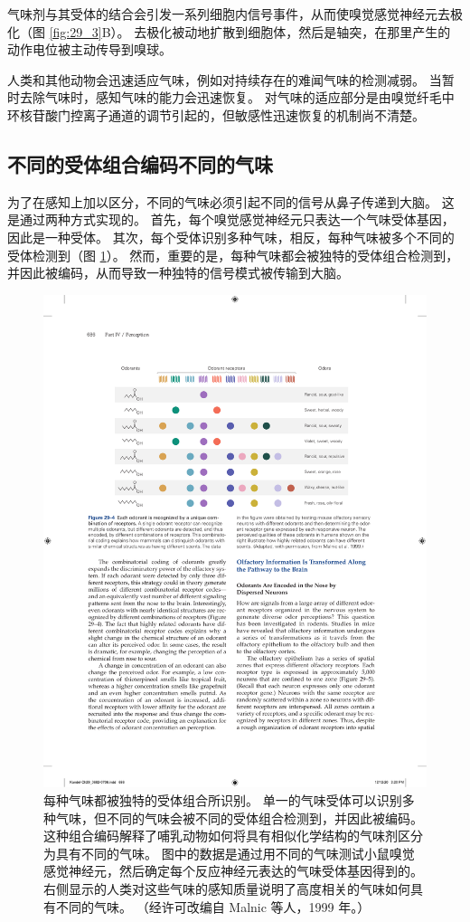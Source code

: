 气味剂与其受体的结合会引发一系列细胞内信号事件，从而使嗅觉感觉神经元去极化（图 \ref{fig:29_3}B）。 去极化被动地扩散到细胞体，然后是轴突，在那里产生的动作电位被主动传导到嗅球。

人类和其他动物会迅速适应气味，例如对持续存在的难闻气味的检测减弱。 当暂时去除气味时，感知气味的能力会迅速恢复。 对气味的适应部分是由嗅觉纤毛中环核苷酸门控离子通道的调节引起的，但敏感性迅速恢复的机制尚不清楚。

\subsection{不同的受体组合编码不同的气味}
为了在感知上加以区分，不同的气味必须引起不同的信号从鼻子传递到大脑。 这是通过两种方式实现的。 首先，每个嗅觉感觉神经元只表达一个气味受体基因，因此是一种受体。 
其次，每个受体识别多种气味，相反，每种气味被多个不同的受体检测到（图 \ref{fig:29_4}）。 
然而，重要的是，每种气味都会被独特的受体组合检测到，并因此被编码，从而导致一种独特的信号模式被传输到大脑。

\begin{figure}[htbp]
	\centering
	\includegraphics[width=0.8\linewidth]{chap29/fig_29_4}
	\caption{每种气味都被独特的受体组合所识别。 单一的气味受体可以识别多种气味，但不同的气味会被不同的受体组合检测到，并因此被编码。 这种组合编码解释了哺乳动物如何将具有相似化学结构的气味剂区分为具有不同的气味。 图中的数据是通过用不同的气味测试小鼠嗅觉感觉神经元，然后确定每个反应神经元表达的气味受体基因得到的。 右侧显示的人类对这些气味的感知质量说明了高度相关的气味如何具有不同的气味。 （经许可改编自 Malnic 等人，1999 年。）}
	\label{fig:29_4}
\end{figure}


